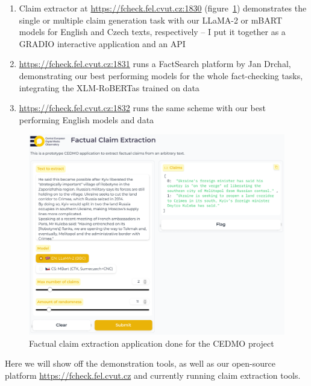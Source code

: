 \begin{enumerate}
    \item Claim extractor at \url{https://fcheck.fel.cvut.cz:1830} (figure~\ref{fig:claimgencedmo}) demonstrates the single or multiple claim generation task with our LLaMA-2 or mBART models for English and Czech texts, respectively -- I put it together as a GRADIO interactive application and an API
    \item  \url{https://fcheck.fel.cvut.cz:1831} runs a FactSearch platform by Jan Drchal, demonstrating our best performing models for the whole fact-checking tasks, integrating the XLM-RoBERTas trained on \FCZNLI data
    \item  \url{https://fcheck.fel.cvut.cz:1832} runs the same scheme with our best performing English models and data
\end{enumerate}

\begin{figure}
    \includegraphics[width=16cm]{fig/cedmo.pdf}
    \caption{Factual claim extraction application done for the CEDMO project}
    \label{fig:claimgencedmo}
\end{figure}

Here we will show off the demonstration tools, as well as our open-source platform \url{https://fcheck.fel.cvut.cz} and currently running claim extraction tools. 
